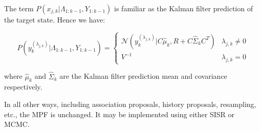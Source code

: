 The term $P(x_{j,k}|\Lambda_{1:k-1}, Y_{1:k-1})$ is familiar as the Kalman filter prediction of the target state. Hence we have:

\begin{equation}
P(y_k^{(\lambda_{j,k})}|\Lambda_{1:k-1}, Y_{1:k-1}) = \begin{cases}
\mathcal{N}(y_k^{(\lambda_{j,k})}|C \hat{\mu}_k, R + C \hat{\Sigma}_k C^T) & \lambda_{j,k} \ne 0 \\
V^{-1} & \lambda_{j,k} = 0
\end{cases} 
\end{equation}

where $\hat{\mu}_k$ and $\hat{\Sigma}_k$ are the Kalman filter prediction mean and covariance respectively.

In all other ways, including association proposals, history proposals, resampling, etc., the MPF is unchanged. It may be implemented using either SISR or MCMC.
